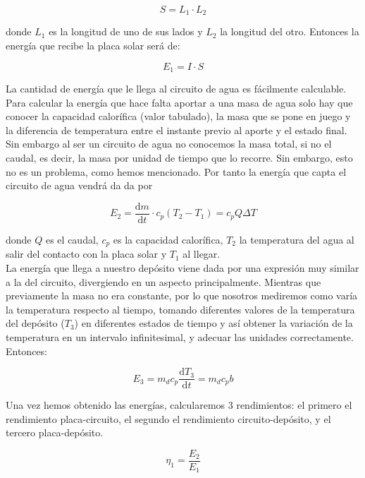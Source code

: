 \documentclass[12pt,a4paper]{article}
\newcommand{\D}{\mathrm{d}}
\begin{document}
\begin{equation}
S = L_1 \cdot L_2
\end{equation}

donde $L_1$ es la longitud de uno de sus lados y $L_2$ la longitud del otro. Entonces la energía que recibe la placa solar será de:

\begin{equation}
E_1 = I \cdot S
\end{equation}

La cantidad de energía que le llega al circuito de agua es fácilmente calculable. Para calcular la energía que hace falta aportar a una masa de agua solo hay que conocer la capacidad calorífica (valor tabulado), la masa que se pone en juego y la diferencia de temperatura entre el instante previo al aporte y el estado final. Sin embargo al ser un circuito de agua no conocemos la masa total, si no el caudal, es decir, la masa por unidad de tiempo que lo recorre. Sin embargo, esto no es un problema, como hemos mencionado. Por tanto la energía que capta el circuito de agua vendrá da da por

\begin{equation}
E_2 = \dfrac{\D m}{\D t} \cdot c_p  (T_2 - T_1) =  c_p Q \Delta T
\end{equation}


donde $Q$ es el caudal, $c_p$ es la capacidad calorífica, $T_2$ la temperatura del agua al salir del contacto con la placa solar y $T_1$ al llegar. \\

La energía que llega a nuestro depósito viene dada por una expresión muy similar a la del circuito, divergiendo en un aspecto principalmente. Mientras que previamente la masa no era constante, por lo que nosotros mediremos como varía la temperatura respecto al tiempo, tomando diferentes valores de la temperatura del depósito ($T_3$) en diferentes estados de tiempo y así obtener la variación de la temperatura en un intervalo infinitesimal, y adecuar las unidades correctamente. Entonces:

\begin{equation}
E_3 = m_{d} c_p \dfrac{\D T_3}{\D t} = m_d c_p  b
\end{equation}


Una vez hemos obtenido las energías, calcularemos 3 rendimientos: el primero el rendimiento placa-circuito, el segundo el rendimiento circuito-depósito, y el tercero placa-depósito.

\begin{equation}
\eta_1 = \dfrac{E_2}{E_1}
\end{equation}
\end{document}

